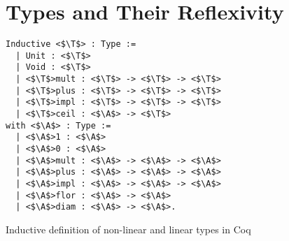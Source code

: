 \section{Types and Their Reflexivity}

\begin{listing}[t]
\begin{verbatim}
Inductive <$\T$> : Type :=
  | Unit : <$\T$>
  | Void : <$\T$>
  | <$\T$>mult : <$\T$> -> <$\T$> -> <$\T$>
  | <$\T$>plus : <$\T$> -> <$\T$> -> <$\T$>
  | <$\T$>impl : <$\T$> -> <$\T$> -> <$\T$>
  | <$\T$>ceil : <$\A$> -> <$\T$>
with <$\A$> : Type :=
  | <$\A$>1 : <$\A$>
  | <$\A$>0 : <$\A$>
  | <$\A$>mult : <$\A$> -> <$\A$> -> <$\A$>
  | <$\A$>plus : <$\A$> -> <$\A$> -> <$\A$>
  | <$\A$>impl : <$\A$> -> <$\A$> -> <$\A$>
  | <$\A$>flor : <$\A$> -> <$\A$>
  | <$\A$>diam : <$\A$> -> <$\A$>.
\end{verbatim}
\caption{Inductive definition of non-linear and linear types in Coq}
\label{listing:coq-linear-nonlinear-types}
\end{listing}


